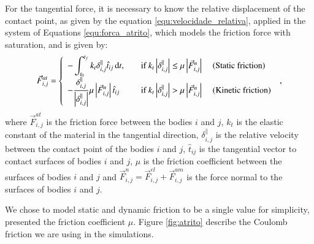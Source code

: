     For the tangential force, it is necessary to know the relative displacement of the contact point, as given by the equation \ref{equ:velocidade_relativa}, applied in the system of Equations \ref{equ:forca_atrito}, which models the friction force with saturation, and is given by:
\begin{equation}
    \label{equ:forca_atrito}
    \vec{F}_{i,j}^{at} = \left\{
    \begin{array}{l l l}
        \displaystyle -\int_{t_{0}}^{t_{f}} k_{t} \delta_{i,j}^{\parallel} \hat{t}_{ij}\, \mathrm{d} t, & \quad \textrm{if } k_{t} \left| \delta_{i,j}^{\parallel} \right| \leq \mu \left|\vec{F}_{i,j}^{n}\right| & \textrm{ (Static friction)} \\
        \displaystyle -\frac{\delta_{i,j}^{\parallel}}{\left|\delta_{i,j}^{\parallel}\right|} \mu \left| \vec{F}_{i,j}^{n} \right| \hat{t}_{ij}\, & \quad \textrm{if } k_{t} \left| \delta_{i,j}^{\parallel} \right| > \mu \left| \vec{F}_{i,j}^{n} \right| & \textrm{ (Kinetic friction)}
    \end{array}
    \right.\ ,
\end{equation}
where $\vec{F}_{i,j}^{at}$ is the friction force between the bodies $i$ and $j$, $k_{t}$ is the elastic constant of the material in the tangential direction, $\delta_{i,j}^{\parallel}$ is the relative velocity between the contact point of the bodies $i$ and $j$, $\hat{t}_{ij}$ is the tangential vector to contact surfaces of bodies $i$ and $j$, $\mu$ is the friction coefficient between the surfaces of bodies $i$ and $j$ and $\vec{F}_{i,j}^{n} = \vec{F}_{i,j}^{el} +\vec{F}_{i,j}^{am}$ is the force normal to the surfaces of bodies $i$ and $j$.

    We chose to model static and dynamic friction to be a single value for simplicity, presented the friction coefficient $\mu$. Figure \ref{fig:atrito} describe the Coulomb friction we are using in the simulations.

